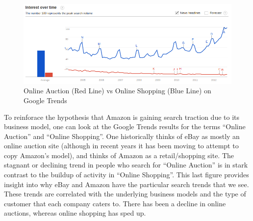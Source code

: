 \documentclass[psamsfonts]{amsart}
\newenvironment{sol}{\vspace{0.25cm}{\large \bfseries Solution:}}{\qedsymbol}
\begin{document}
\begin{sol}
\begin{figure}[h!]
\includegraphics[width=6in]{online_shopping_vs_auction.png}
\caption{Online Auction (Red Line) vs Online Shopping (Blue Line) on Google Trends}
\end{figure}

To reinforace the hypothesis that Amazon is gaining search traction due to its business model, one can look at the Google Trends results for the terms ``Online Auction'' and ``Online Shopping''. One historically thinks of eBay as mostly an online auction site (although in recent years it has been moving to attempt to copy Amazon's model), and thinks of Amazon as a retail/shopping site. The stagnant or declining trend in people who search for ``Online Auction'' is in stark contrast to the buildup of activity in ``Online Shopping''. This last figure provides insight into why eBay and Amazon have the particular search trends that we see. These trends are correlated with the underlying business models and the type of customer that each company caters to. There has been a decline in online auctions, whereas online shopping has sped up. 
\end{sol}
\end{document}

